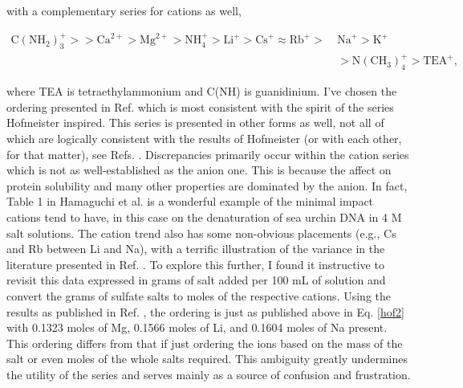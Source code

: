 \begin{intro}
    \noindent with a complementary series for cations as well,
    
    \begin{equation}\label{hof2}
     \begin{split}
     \text{C}(\text{NH}_{2})_{3}^{+} >> \text{Ca}^{2+} > \text{Mg}^{2+} > \text{NH}_{4}^{+} > \text{Li}^{+} > \text{Cs}^{+} \approx \text{Rb}^{+} >~&\text{Na}^{+} > \text{K}^{+} \\
     &> \text{N}(\text{CH}_{3})_{4}^{+} > \text{TEA}^{+},
     \end{split}
    \end{equation}
    
    \noindent where TEA\sur{+} is tetraethylammonium and C(NH) is guanidinium. I've chosen the ordering presented in Ref. \cite{mazzini2016specific} which
    is most consistent with the spirit of the series Hofmeister inspired\cite{kunz2004translation}. This series is presented in other forms as well, not all of which are logically
    consistent with the results of Hofmeister (or with each other, for that matter), see Refs. \cite{collins2004ions,kunz2010book,marcus2009effect,salis2014models,schwierz2016reversed}. 
    Discrepancies primarily occur within the cation series which is not as well-established as the anion one. This is because the affect on protein solubility and many other properties
    are dominated by the anion\cite{hamaguchi1962effect,marcus2009effect}. In fact, Table 1 in Hamaguchi et al. is a wonderful example of the minimal impact cations tend to have, in 
    this case on the denaturation of sea urchin DNA in 4 M salt solutions\cite{hamaguchi1962effect}. The cation trend also has some non-obvious placements (e.g., Cs\sur{+} and Rb\sur{+} 
    between Li\sur{+} and Na\sur{+}), with a terrific illustration of the variance in the literature presented in Ref. \cite{mazzini2016specific}. To explore this further, I found it 
    instructive to revisit this data expressed in grams of salt added per 100 mL of solution and convert the grams of sulfate salts to moles of the respective cations. Using the results 
    as published in Ref. \cite{kunz2004translation}, the ordering is just as published above in Eq. \ref{hof2} with 0.1323 moles of Mg\sur{+}, 0.1566 moles of Li\sur{+}, and 0.1604 moles 
    of Na\sur{+} present. This ordering differs from that if just ordering the ions based on the mass of the salt or even moles of the whole salts required. This ambiguity greatly 
    undermines the utility of the series and serves mainly as a source of confusion and frustration.
    

\end{intro}
